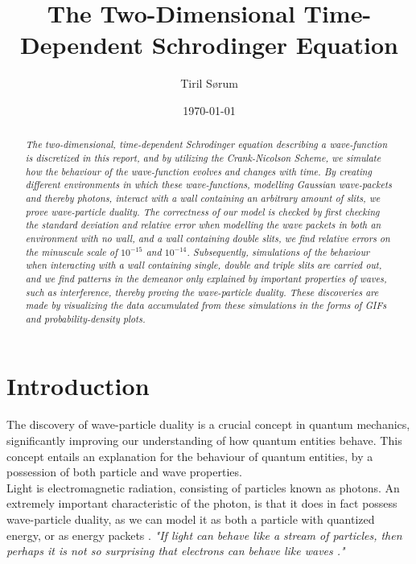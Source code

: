 \documentclass[10pt, nofootinbib, twocolumn]{revtex4-1}
\begin{document}
\vspace*{5\baselineskip}
\title{The Two-Dimensional Time-Dependent Schrodinger Equation} 
\author{Tiril Sørum}
\date{\today}        
\begin{abstract}
\vspace*{1\baselineskip}
    \textit{The two-dimensional, time-dependent Schrodinger equation describing a wave-function is discretized in this report, and by utilizing \textit{the Crank-Nicolson Scheme}, we simulate how the behaviour of the wave-function evolves and changes with time. By creating different environments in which these wave-functions, modelling Gaussian wave-packets and thereby photons, interact with a wall containing an arbitrary amount of slits, we prove wave-particle duality. The correctness of our model is checked by first checking the standard deviation and relative error when modelling the wave packets in both an environment with no wall, and a wall containing double slits, we find relative errors on the minuscule scale of $10^{-15}$ and $10^{-14}$. Subsequently, simulations of the behaviour when interacting with a wall containing single, double and triple slits are carried out, and we find patterns in the demeanor only explained by important properties of waves, such as interference, thereby proving the wave-particle duality. These discoveries are made by visualizing the data accumulated from these simulations in the forms of GIFs and probability-density plots. }
\end{abstract}
\maketitle       

\section{Introduction}\label{sec:introduction}
The discovery of wave-particle duality is a crucial concept in quantum mechanics, significantly improving our understanding of how quantum entities behave. This concept entails an explanation for the behaviour of quantum entities, by a possession of both particle and wave properties. \\

Light is electromagnetic radiation, consisting of particles known as photons. An extremely important characteristic of the photon, is that it does in fact possess wave-particle duality, as we can model it as both a particle with quantized energy, or as energy packets \cite{kvante}. \textit{"If light can behave like a stream of particles, then perhaps it is not so surprising that electrons can behave like waves \cite{thermal}."}\\
\end{document}
